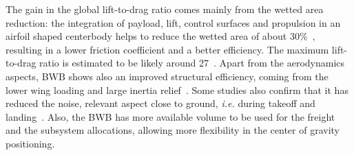 The gain in the global lift-to-drag ratio comes mainly from the wetted area reduction: the integration of payload, lift, control surfaces and propulsion in an airfoil shaped centerbody helps to reduce the wetted area of about 30\%~\cite{bib:liebeck_1998}, resulting in a lower friction coefficient and a better efficiency. 
The maximum lift-to-drag ratio is estimated to be likely around 27~\cite{bib:torenbeek_bwb}.
Apart from the aerodynamics aspects, BWB shows also an improved structural efficiency, coming from the lower wing loading and large inertia relief~\cite{bib:liebeck_2004}.
Some studies also confirm that it has reduced the noise, relevant aspect close to ground, \textit{i.e.} during takeoff and landing~\cite{bib:bwb_n3_vol1}. 
Also, the BWB has more available volume to be used for the freight and the subsystem allocations, allowing more flexibility in the center of gravity positioning. 

